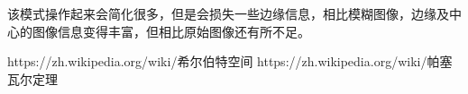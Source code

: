 \documentclass[journal]{IEEEtran}
\begin{document}
该模式操作起来会简化很多，但是会损失一些边缘信息，相比模糊图像，边缘及中心的图像信息变得丰富，但相比原始图像还有所不足。


%



\ifCLASSOPTIONcaptionsoff
  \newpage
\fi

\begin{thebibliography}{2}
	https://zh.wikipedia.org/wiki/希尔伯特空间
	https://zh.wikipedia.org/wiki/帕塞瓦尔定理
\end{thebibliography}



%
%
%
\end{document}
